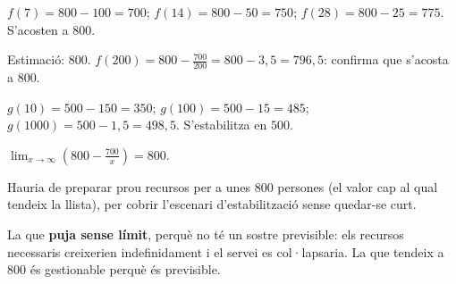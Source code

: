 \begin{solucions}
\begin{sollist}
  \item $f(7)=800-100=700$; $f(14)=800-50=750$; $f(28)=800-25=775$. S'acosten a $800$.
  \item Estimació: $800$. $f(200)=800-\frac{700}{200}=800-3,5=796,5$: confirma que
        s'acosta a $800$.
  \item $g(10)=500-150=350$; $g(100)=500-15=485$; $g(1000)=500-1,5=498,5$.
        S'estabilitza en $500$.
  \item $\displaystyle\lim_{x\to\infty}\left(800-\frac{700}{x}\right)=800$.
  \item Hauria de preparar prou recursos per a unes $800$ persones (el valor cap al
        qual tendeix la llista), per cobrir l'escenari d'estabilització sense
        quedar-se curt.
  \item La que \textbf{puja sense límit}, perquè no té un sostre previsible: els
        recursos necessaris creixerien indefinidament i el servei es col·lapsaria. La
        que tendeix a $800$ és gestionable perquè és previsible.
\end{sollist}
\end{solucions}

